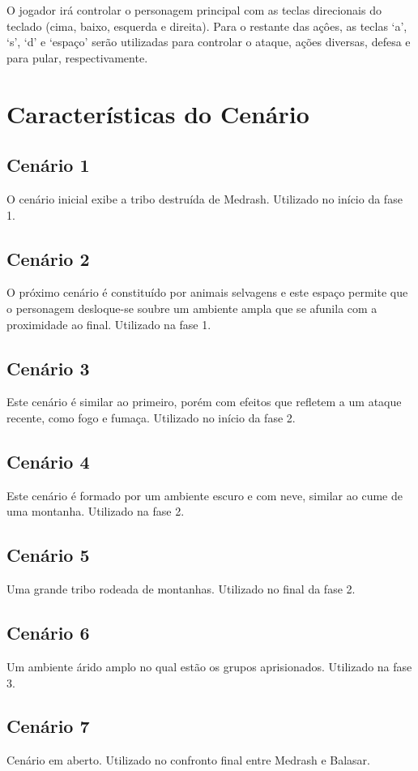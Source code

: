 \documentclass[letterpaper,11pt]{article}
\begin{document}
O jogador irá controlar o personagem principal com as teclas direcionais do teclado (cima, baixo, esquerda e direita). 
Para o restante das açôes, as teclas `a', `s', `d' e `espaço' serão utilizadas para controlar o ataque, ações diversas, defesa e para pular, respectivamente.

\section{Características do Cenário}

\subsection{Cenário 1}
 O cenário inicial exibe a tribo destruída de Medrash. Utilizado no início da fase 1.

\subsection{Cenário 2}
 O próximo cenário é constituído por animais selvagens e este espaço permite que o personagem desloque-se soubre um ambiente ampla que se afunila com a proximidade ao final. Utilizado na fase 1.

\subsection{Cenário 3}
 Este cenário é similar ao primeiro, porém com efeitos que refletem a um ataque recente, como fogo e fumaça. Utilizado no início da fase 2.

\subsection{Cenário 4}
 Este cenário é formado por um ambiente escuro e com neve, similar ao cume de uma montanha. Utilizado na fase 2.

\subsection{Cenário 5}
 Uma grande tribo rodeada de montanhas. Utilizado no final da fase 2.

\subsection{Cenário 6}
 Um ambiente árido amplo no qual estão os grupos aprisionados. Utilizado na fase 3.

\subsection{Cenário 7}
 Cenário em aberto. Utilizado no confronto final entre Medrash e Balasar.
\end{document}
